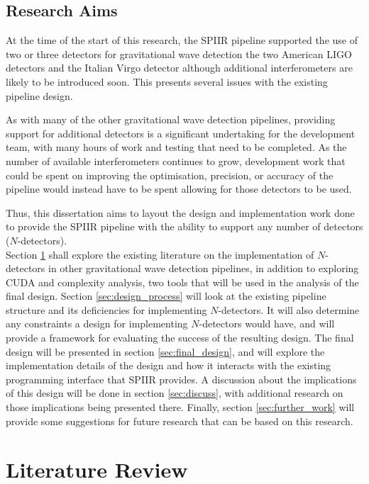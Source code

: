 \documentclass{article}
\begin{document}
\subsection{Research Aims} \label{sec:introduction:aims}

At the time of the start of this research, the SPIIR pipeline supported the use of two or three detectors for gravitational wave detection \textemdash{} the two American LIGO detectors and the Italian Virgo detector \textemdash{} although additional interferometers are likely to be introduced soon.
This presents several issues with the existing pipeline design.

As with many of the other gravitational wave detection pipelines, providing support for additional detectors is a significant undertaking for the development team, with many hours of work and testing that need to be completed.
As the number of available interferometers continues to grow, development work that could be spent on improving the optimisation, precision, or accuracy of the pipeline would instead have to be spent allowing for those detectors to be used.

Thus, this dissertation aims to layout the design and implementation work done to provide the SPIIR pipeline with the ability to support any number of detectors (\(N\)-detectors).
\\

Section \ref{sec:lit_review} shall explore the existing literature on the implementation of \(N\)-detectors in other gravitational wave detection pipelines, in addition to exploring CUDA and complexity analysis, two tools that will be used in the analysis of the final design.
Section \ref{sec:design_process} will look at the existing pipeline structure and its deficiencies for implementing \(N\)-detectors.
It will also determine any constraints a design for implementing \(N\)-detectors would have, and will provide a framework for evaluating the success of the resulting design.
The final design will be presented in section \ref{sec:final_design}, and will explore the implementation details of the design and how it interacts with the existing programming interface that SPIIR provides.
A discussion about the implications of this design will be done in section \ref{sec:discuss}, with additional research on those implications being presented there.
Finally, section \ref{sec:further_work} will provide some suggestions for future research that can be based on this research.

\section{Literature Review} \label{sec:lit_review}
\end{document}
